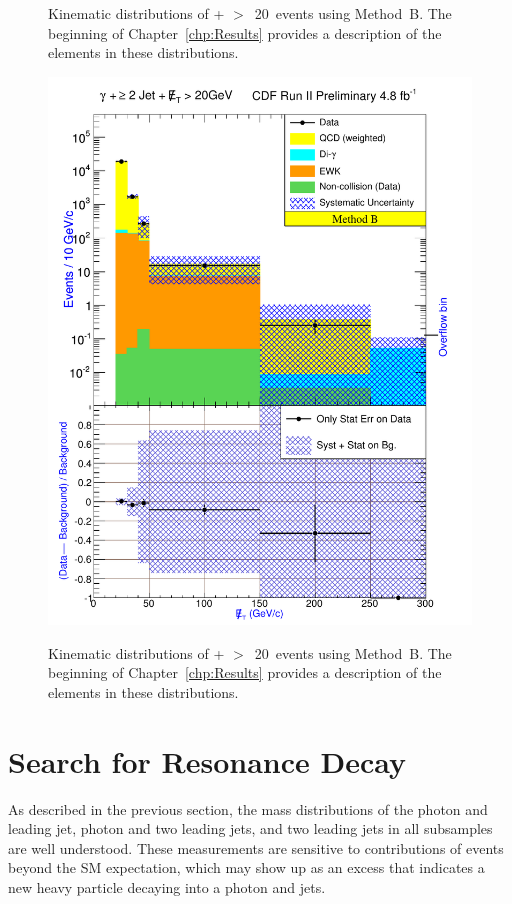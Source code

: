 \begin{figure}[h!]
\caption{Kinematic distributions of \photwojet + \met$>$~20~\etUnits events using \mbox{Method B}. The beginning of Chapter~\ref{chp:Results} provides a description of the elements in these distributions.}
\label{fig:pjmetMtdBSetThree}
\end{figure}
\clearpage

\begin{figure}[h!]
\centering
{\includegraphics[keepaspectratio=true, scale=0.7]{G30JetsMet20_MtdB_plot2_Met.pdf}}
\caption{Kinematic distributions of \photwojet + \met$>$~20~\etUnits events using \mbox{Method B}. The beginning of Chapter~\ref{chp:Results} provides a description of the elements in these distributions.}
\label{fig:pjmetMtdBSetFour}
\end{figure}



\clearpage
\section{Search for Resonance Decay}
As described in the previous section, the mass distributions of the photon and leading jet, photon and two leading jets, and two leading jets in all subsamples are well understood. These measurements are sensitive to contributions of events beyond the SM expectation, which may show up as an excess that indicates a new heavy particle decaying into a photon and jets.

